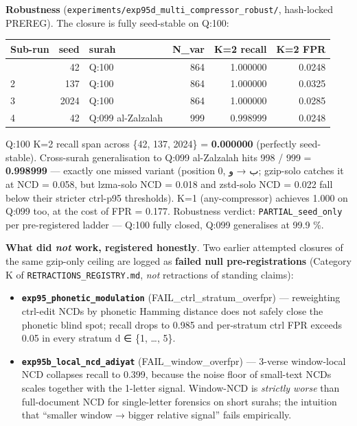 \documentclass[
]{article}
\newcounter{none} %
\providecommand{\tightlist}{%
  \setlength{\itemsep}{0pt}\setlength{\parskip}{0pt}}
\begin{document}
\textbf{Robustness}
(\texttt{experiments/exp95d\_multi\_compressor\_robust/}, hash-locked
PREREG). The closure is fully seed-stable on Q:100:

{\def\LTcaptype{none} %
\begin{longtable}[]{@{}lrlrrr@{}}
\toprule\noalign{}
Sub-run & seed & surah & N\_var & K=2 recall & K=2 FPR \\
\midrule\noalign{}
\endhead
\bottomrule\noalign{}
\endlastfoot
1 & 42 & Q:100 & 864 & 1.000000 & 0.0248 \\
2 & 137 & Q:100 & 864 & 1.000000 & 0.0325 \\
3 & 2024 & Q:100 & 864 & 1.000000 & 0.0285 \\
4 & 42 & Q:099 al-Zalzalah & 999 & 0.998999 & 0.0248 \\
\end{longtable}
}

Q:100 K=2 recall span across \{42, 137, 2024\} = \textbf{0.000000}
(perfectly seed-stable). Cross-surah generalisation to Q:099 al-Zalzalah
hits 998 / 999 = \textbf{0.998999} --- exactly one missed variant
(position 0, ب → و; gzip-solo catches it at NCD = 0.058, but lzma-solo
NCD = 0.018 and zstd-solo NCD = 0.022 fall below their stricter ctrl-p95
thresholds). K=1 (any-compressor) achieves 1.000 on Q:099 too, at the
cost of FPR = 0.177. Robustness verdict: \texttt{PARTIAL\_seed\_only}
per pre-registered ladder --- Q:100 fully closed, Q:099 generalises at
99.9 \%.

\textbf{What did \emph{not} work, registered honestly}. Two earlier
attempted closures of the same gzip-only ceiling are logged as
\textbf{failed null pre-registrations} (Category K of
\texttt{RETRACTIONS\_REGISTRY.md}, \emph{not} retractions of standing
claims):

\begin{itemize}
\tightlist
\item
  \textbf{\texttt{exp95\_phonetic\_modulation}}
  (FAIL\_ctrl\_stratum\_overfpr) --- reweighting ctrl-edit NCDs by
  phonetic Hamming distance does not safely close the phonetic blind
  spot; recall drops to 0.985 and per-stratum ctrl FPR exceeds 0.05 in
  every stratum d ∈ \{1, \ldots, 5\}.
\item
  \textbf{\texttt{exp95b\_local\_ncd\_adiyat}} (FAIL\_window\_overfpr)
  --- 3-verse window-local NCD collapses recall to 0.399, because the
  noise floor of small-text NCDs scales together with the 1-letter
  signal. Window-NCD is \emph{strictly worse} than full-document NCD for
  single-letter forensics on short surahs; the intuition that ``smaller
  window → bigger relative signal'' fails empirically.
\end{itemize}
\end{document}
